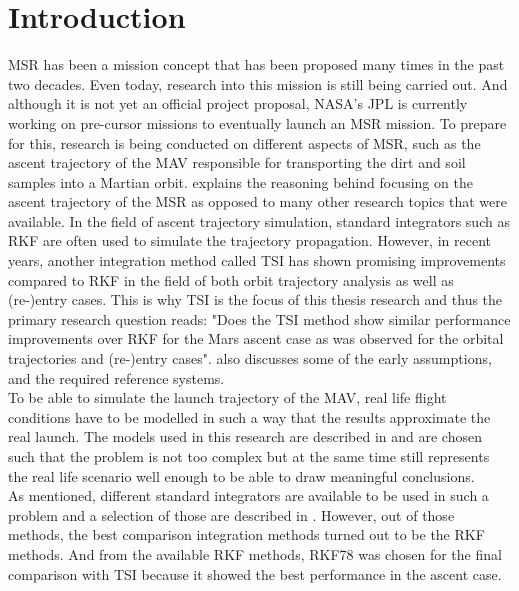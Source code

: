 \chapter{Introduction}  
\label{ch:intro}
\acf{MSR} has been a mission concept that has been proposed many times in the past two decades. Even today, research into this mission is still being carried out. And although it is not yet an official project proposal, NASA's \acf{JPL} is currently working on pre-cursor missions to eventually launch an \ac{MSR} mission. To prepare for this, research is being conducted on different aspects of \ac{MSR}, such as the ascent trajectory of the \acf{MAV} responsible for transporting the dirt and soil samples into a Martian orbit.  explains the reasoning behind focusing on the ascent trajectory of the \ac{MSR} as opposed to many other research topics that were available. In the field of ascent trajectory simulation, standard integrators such as \acf{RKF} are often used to simulate the trajectory propagation. However, in recent years, another integration method called \acf{TSI} has shown promising improvements compared to \ac{RKF} in the field of both orbit trajectory analysis as well as (re-)entry cases. This is why \ac{TSI} is the focus of this thesis research and thus the primary research question reads: "Does the \acl{TSI} method show similar performance improvements over \acl{RKF} for the Mars ascent case as was observed for the orbital trajectories and (re-)entry cases".  also discusses some of the early assumptions, and the required reference systems.\\
To be able to simulate the launch trajectory of the \ac{MAV}, real life flight conditions have to be modelled in such a way that the results approximate the real launch. The models used in this research are described in  and are chosen such that the problem is not too complex but at the same time still represents the real life scenario well enough to be able to draw meaningful conclusions.\\
As mentioned, different standard integrators are available to be used in such a problem and a selection of those are described in . However, out of those methods, the best comparison integration methods turned out to be the \ac{RKF} methods. And from the available \ac{RKF} methods, \acf{RKF78} was chosen for the final comparison with \ac{TSI} because it showed the best performance in the ascent case. 
